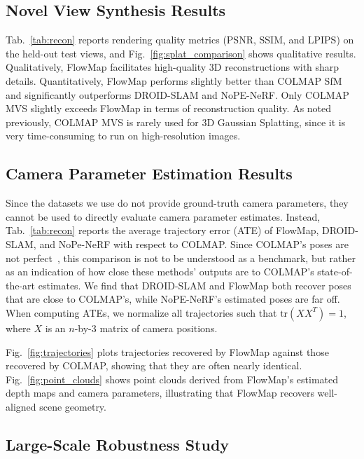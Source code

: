 \subsection{Novel View Synthesis Results}

Tab.~\ref{tab:recon} reports rendering quality metrics (PSNR, SSIM, and LPIPS) on the held-out test views, and Fig.~\ref{fig:splat_comparison} shows qualitative results.
Qualitatively, FlowMap facilitates high-quality 3D reconstructions with sharp details.
Quantitatively, FlowMap performs slightly better than COLMAP SfM and significantly outperforms DROID-SLAM and NoPE-NeRF.
Only COLMAP MVS slightly exceeds FlowMap in terms of reconstruction quality.
As noted previously, COLMAP MVS is rarely used for 3D Gaussian Splatting, since it is very time-consuming to run on high-resolution images.

\subsection{Camera Parameter Estimation Results}

Since the datasets we use do not provide ground-truth camera parameters, they cannot be used to directly evaluate camera parameter estimates.
Instead, Tab.~\ref{tab:recon} reports the average trajectory error (ATE) of FlowMap, DROID-SLAM, and NoPe-NeRF with respect to COLMAP.
Since COLMAP's poses are not perfect~\cite{park2023camp}, this comparison is not to be understood as a benchmark, but rather as an indication of how close these methods' outputs are to COLMAP's state-of-the-art estimates.
We find that DROID-SLAM and FlowMap both recover poses that are close to COLMAP's, while NoPE-NeRF's estimated poses are far off.
When computing ATEs, we normalize all trajectories such that $\text{tr}(XX^T) = 1$, where $X$ is an $n$-by-3 matrix of camera positions.

Fig.~\ref{fig:trajectories} plots trajectories recovered by FlowMap against those recovered by COLMAP, showing that they are often nearly identical.
Fig.~\ref{fig:point_clouds} shows point clouds derived from FlowMap's estimated depth maps and camera parameters, illustrating that FlowMap recovers well-aligned scene geometry.

\subsection{Large-Scale Robustness Study}



